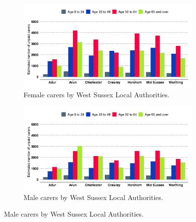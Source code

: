 \begin{figure}[H]
    \caption{Estimated number of unpaid carers in West Sussex.}
    \label{figure:unpaidcarers:dabs}
    \centering
    \begin{subfigure}[b]{0.99\linewidth}
        \centering
        \caption{Female carers by West Sussex Local Authorities.}\label{fig:unpaidcarers:dabs:female}
        \includegraphics[width=\linewidth]{images/female_unpaid_carers.png}
    \end{subfigure}
    \begin{subfigure}[b]{0.99\linewidth}
        \centering
        \caption{Male carers by West Sussex Local Authorities.}\label{fig:unpaidcarers:dabs:male}        
        \includegraphics[width=\linewidth]{images/male_unpaid_carers.png}
    \end{subfigure}
    \vspace*{3mm}
\end{figure}


